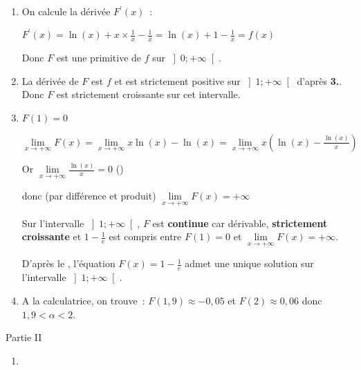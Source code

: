 \begin{corrige}
\begin{enumerate}
\begin{center}
\begin{extern}
{\begin{tikzpicture}[scale=.8, line width=.5pt, dark]
       \end{tikzpicture}
      }
   \end{extern}
\end{center}
\item
          On calcule la dérivée $F^{\prime}\left(x\right)$ :
          \par
          $F^{\prime}\left(x\right)=\ln\left(x\right)+x\times \frac{1}{x}-\frac{1}{x}=\ln\left(x\right)+1-\frac{1}{x}=f\left(x\right)$
          \par
          Donc $F$ est une primitive de $f$ sur $\left]0;+\infty \right[$.
          \item
          La dérivée de $F$ est $f$ et est strictement positive sur $\left]1;+\infty \right[$ d'après \textbf{3.}. Donc $F$ est strictement croissante sur cet intervalle.
          \item
          $F\left(1\right)=0$
          \par
          $\lim\limits_{x\rightarrow +\infty }F\left(x\right)=\lim\limits_{x\rightarrow +\infty }x\ln\left(x\right)-\ln\left(x\right)=\lim\limits_{x\rightarrow +\infty }x\left(\ln\left(x\right)-\frac{\ln\left(x\right)}{x}\right)$
          \par
          Or $\lim\limits_{x\rightarrow +\infty }\frac{\ln\left(x\right)}{x}=0$ ()
          \par
          donc (par différence et produit) $\lim\limits_{x\rightarrow +\infty }F\left(x\right)=+\infty $
          \par
          Sur l'intervalle $\left]1;+\infty \right[$, $F$ est \textbf{continue} car dérivable, \textbf{strictement croissante} et  $1-\frac{1}{e}$ est compris entre $F\left(1\right)=0$ et  $\lim\limits_{x\rightarrow +\infty }F\left(x\right)=+\infty $.
          \par
          D'après le ,  l'équation $F\left(x\right)=1-\frac{1}{e}$ admet une unique solution sur l'intervalle $\left]1;+\infty \right[$.
          \item
          A la calculatrice, on trouve : $F\left(1,9\right)\approx -0,05$ et $F\left(2\right)\approx 0,06$ donc $1,9 < \alpha  < 2$.
     \end{enumerate}
     \begin{h3} Partie II \end{h3}
     \begin{enumerate}
          \item

\end{enumerate}
\end{corrige}
